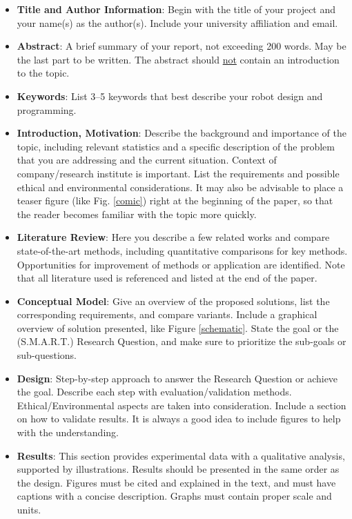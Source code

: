 \documentclass[conference]{IEEEtran}
\begin{document}
\begin{itemize}
    \item \textbf{Title and Author Information}: Begin with the title of your project and your name(s) as the author(s). Include your university affiliation and email.
    \item \textbf{Abstract}: A brief summary of your report, not exceeding 200 words.  May be the last part to be written. The abstract should \underline{not} contain an introduction to the topic.
    \item \textbf{Keywords}: List 3–5 keywords that best describe your robot design and programming.
    \item \textbf{Introduction, Motivation}: Describe the background and importance of the topic, including relevant statistics and a specific description of the problem that you are addressing and the current situation. Context of company/research institute is important. List the requirements and possible ethical and environmental considerations. It may also be advisable to place a teaser figure (like Fig. \ref{comic}) right at the beginning of the paper, so that the reader becomes familiar with the topic more quickly. 
     \item \textbf{Literature Review}: Here you describe a few related works and compare state-of-the-art methods, including quantitative comparisons for key methods. Opportunities for improvement of methods or application are identified. Note that all literature used is referenced and listed at the end of the paper.
     \item \textbf{Conceptual Model}: Give an overview of the proposed solutions, list the corresponding requirements, and compare variants. Include a graphical overview of solution presented, like Figure \ref{schematic}. State the goal or the (S.M.A.R.T.) Research Question, and make sure to prioritize the sub-goals or sub-questions. 
    \item \textbf{Design}: Step-by-step approach to answer the Research Question or achieve the goal. Describe each step with evaluation/validation methods. Ethical/Environmental aspects are taken into consideration. Include a section on how to validate results. It is always a good idea to include figures to help with the understanding.
    \item \textbf{Results}: This section provides experimental data with a qualitative analysis, supported by illustrations. Results should be presented in the same order as the design. Figures must be cited and explained in the text, and must have captions with a concise description. Graphs must contain proper scale and units. 

\end{itemize}
\end{document}
